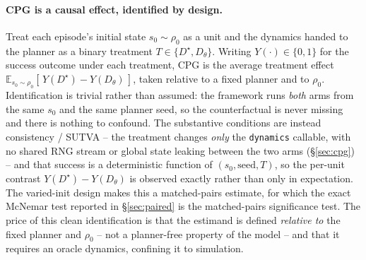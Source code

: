 \documentclass[10pt,letterpaper]{article}
\begin{document}
\paragraph{CPG is a causal effect, identified by design.} Treat each episode's initial state $s_0 \sim \rho_0$ as a unit and the dynamics handed to the planner as a binary treatment $T \in \{D^\star, D_\theta\}$. Writing $Y(\cdot) \in \{0, 1\}$ for the success outcome under each treatment, CPG is the average treatment effect $\mathbb{E}_{s_0 \sim \rho_0}\!\left[\, Y(D^\star) - Y(D_\theta) \,\right]$, taken relative to a fixed planner and to $\rho_0$. Identification is trivial rather than assumed: the framework runs \emph{both} arms from the same $s_0$ and the same planner seed, so the counterfactual is never missing and there is nothing to confound. The substantive conditions are instead consistency / SUTVA -- the treatment changes \emph{only} the \texttt{dynamics} callable, with no shared RNG stream or global state leaking between the two arms (\S\ref{sec:cpg}) -- and that success is a deterministic function of $(s_0, \mathrm{seed}, T)$, so the per-unit contrast $Y(D^\star) - Y(D_\theta)$ is observed exactly rather than only in expectation. The varied-init design makes this a matched-pairs estimate, for which the exact McNemar test reported in \S\ref{sec:paired} is the matched-pairs significance test. The price of this clean identification is that the estimand is defined \emph{relative to} the fixed planner and $\rho_0$ -- not a planner-free property of the model -- and that it requires an oracle dynamics, confining it to simulation.
\end{document}
